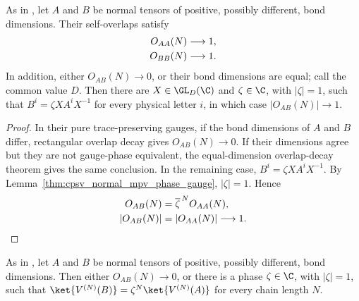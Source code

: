\begin{lemma}
    \label{thm:cpsv_normal_overlap_dichotomy}
    \leanok
    As in \cite[Lemma~A.2]{Cirac2016MPDO_arXiv}, let $A$ and $B$ be normal
    tensors of positive, possibly different, bond dimensions. Their
    self-overlaps satisfy
    \begin{align}
        O_{AA}(N) & \longrightarrow 1,
        \notag                         \\
        O_{BB}(N) & \longrightarrow 1.
        \notag
    \end{align}
    In addition, either $O_{AB}(N)\longrightarrow 0$, or their bond dimensions
    are equal; call the common value $D$. Then there are $X\in\GL_D(\C)$ and
    $\zeta\in\C$, with $|\zeta|=1$, such that
    $B^i=\zeta X A^iX^{-1}$ for every physical letter $i$, in which case
    $|O_{AB}(N)|\to 1$.
\end{lemma}

\begin{proof}\leanok
    In their pure trace-preserving gauges, if the bond dimensions of $A$ and
    $B$ differ, rectangular overlap decay gives $O_{AB}(N)\to0$. If
    their dimensions agree but they are not gauge-phase equivalent, the
    equal-dimension overlap-decay theorem gives the same conclusion. In the
    remaining case, $B^i=\zeta X A^iX^{-1}$. By
    Lemma~\ref{thm:cpsv_normal_mpv_phase_gauge}, $|\zeta|=1$. Hence
    \begin{align}
        O_{AB}(N)
         & =\overline{\zeta}^{\,N}O_{AA}(N),
        \notag                               \\
        |O_{AB}(N)|
         & =|O_{AA}(N)|\longrightarrow1.
        \notag
    \end{align}
\end{proof}

\begin{lemma}
    \label{thm:cpsv_normal_mpv_phase_alternative}
    \leanok
    As in \cite[Corollary~A.3]{Cirac2016MPDO_arXiv}, let $A$ and $B$ be normal
    tensors of positive, possibly different, bond dimensions. Then either
    $O_{AB}(N)\to0$, or there is a phase $\zeta\in\C$, with $|\zeta|=1$, such
    that $\ket{V^{(N)}(B)}=\zeta^N\ket{V^{(N)}(A)}$ for every chain length $N$.
\end{lemma}

